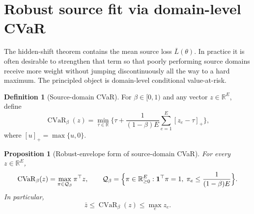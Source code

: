 \documentclass[11pt]{article}
\newcommand{\R}{\mathbb{R}}
\newcommand{\1}{\mathbf{1}}
\newcommand{\cvar}{\operatorname{CVaR}}
\newcommand{\Qset}{\mathcal{Q}_\beta}
\theoremstyle{plain}
\newtheorem{proposition}[theorem]{Proposition}
\theoremstyle{definition}
\newtheorem{definition}[theorem]{Definition}
\theoremstyle{remark}
\begin{document}
\section{Robust source fit via domain-level CVaR}
The hidden-shift theorem contains the mean source loss $\bar L(\theta)$. In practice it is often desirable to strengthen that term so that poorly performing source domains receive more weight without jumping discontinuously all the way to a hard maximum. The principled object is domain-level conditional value-at-risk.

\begin{definition}[Source-domain CVaR]
For $\beta \in [0,1)$ and any vector $z \in \R^E$, define
\[
\cvar_{\beta}(z)
= \min_{\tau \in \R} \Biggl\{\tau + \frac{1}{(1-\beta)E}\sum_{e=1}^E [z_e - \tau]_+\Biggr\},
\]
where $[u]_+ = \max\{u,0\}$.
\end{definition}

\begin{proposition}[Robust-envelope form of source-domain CVaR]\label{prop:cvar_dual}
For every $z \in \R^E$,
\[
\cvar_{\beta}(z)
= \max_{\pi \in \Qset} \pi^\top z,
\qquad
\Qset = \Bigl\{\pi \in \R^E_{\ge 0} : \1^\top \pi = 1,\; \pi_e \le \frac{1}{(1-\beta)E}\Bigr\}.
\]
In particular,
\[
\bar z \le \cvar_{\beta}(z) \le \max_e z_e.
\]
\end{proposition}
\end{document}
